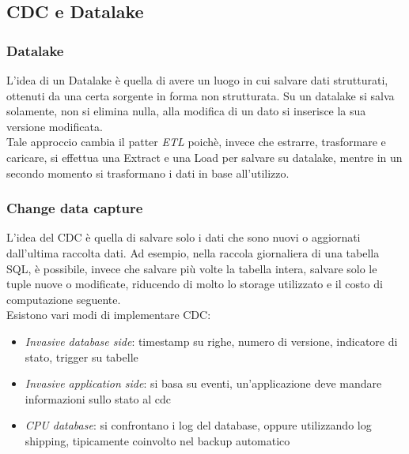 \subsection{CDC e Datalake}

\subsubsection{Datalake}
L'idea di un Datalake è quella di avere un luogo in cui salvare dati strutturati, 
ottenuti da una certa sorgente in forma non strutturata. Su un datalake si salva 
solamente, non si elimina nulla, alla modifica di un dato si inserisce la sua versione 
modificata.\\
Tale approccio cambia il patter \emph{ETL} poichè, invece che estrarre, trasformare e caricare, 
si effettua una Extract e una 
Load per salvare su datalake, mentre in un secondo momento si trasformano i dati in base 
all'utilizzo.

\subsubsection{Change data capture}
L'idea del CDC è quella di salvare solo i dati che sono nuovi o aggiornati dall'ultima
raccolta dati. Ad esempio, nella raccola giornaliera di una tabella SQL, è possibile, 
invece che salvare più volte la tabella intera, salvare solo le tuple nuove o 
modificate, riducendo di molto lo storage utilizzato e il costo di computazione 
seguente.\\
Esistono vari modi di implementare CDC:
\begin{itemize}
    \item \emph{Invasive database side}: timestamp su righe, numero di versione, 
    indicatore di stato, trigger su tabelle
    \item \emph{Invasive application side}: si basa su eventi, un'applicazione deve mandare 
    informazioni sullo stato al cdc 
    \item \emph{CPU database}: si confrontano i log del database, oppure utilizzando log shipping, 
    tipicamente coinvolto nel backup automatico
\end{itemize}

